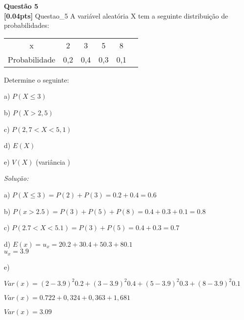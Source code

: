 \documentclass{article}
\newenvironment{problem}[2][Questão]
    { \begin{mdframed}[backgroundcolor=gray!20] \textbf{#1 #2} \\}
    {  \end{mdframed}}
\newenvironment{solution}
    {\textit{Solução:}}
    {}
\begin{document}
\begin{problem}{5}
\textbf{[0.04pts]} Questao\_5 A variável aleatória X tem a seguinte distribuição de probabilidades:


\begin{center}
\begin{tabular}{ |c|c|c|c|c|c|}
\hline

x & 2 & 3 & 5 & 8 \\
Probabilidade & 0,2 & 0,4 & 0,3 & 0,1 \\

 \hline
\end{tabular}
\end{center}

Determine o seguinte: 
 
a) $P(X \leq 3)$ 
 
b) $P(X > 2,5)$

c) $P(2,7 < X < 5,1) $

d) $E(X)$ 

e) $V(X)$ (variância ) 

\end{problem}

\begin{solution}

a) $P (X \leq 3) = P(2) + P(3) = 0.2 + 0.4 = 0.6$

b) $P(x>2.5) = P(3) + P(5) + P(8) = 0.4 + 0.3 + 0.1 = 0.8$

c) $P(2.7 < X < 5.1) = P(3) + P(5) = 0.4 + 0.3 = 0.7$

d) $E(x) = u_{x} = 2 0.2 + 3 0.4 + 5 0.3 + 8 0.1$ \\

$u_{x} = 3.9$

e) 

$Var(x) = (2-3.9)^{2}0.2 + (3-3.9)^{2} 0.4 + (5-3.9)^{2} 0.3 + (8 -3.9)^{2} 0.1 $

$Var(x) = 0.722 + 0,324 + 0,363 + 1,681$

$Var(x) = 3.09$

\end{solution}
\end{document}
